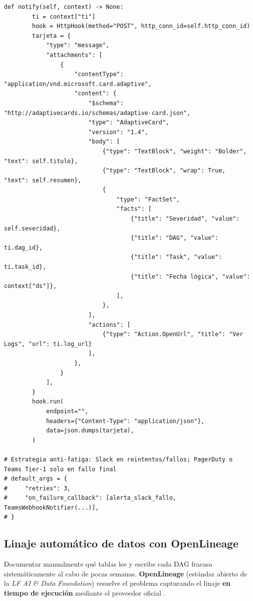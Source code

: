 \begin{lstlisting}[style=python, caption={Configuración de \texttt{SlackWebhookNotifier} y desarrollo de un \texttt{BaseNotifier} propio para Microsoft Teams.}, label={lst:notifiers-produccion}]
    def notify(self, context) -> None:
        ti = context["ti"]
        hook = HttpHook(method="POST", http_conn_id=self.http_conn_id)
        tarjeta = {
            "type": "message",
            "attachments": [
                {
                    "contentType": "application/vnd.microsoft.card.adaptive",
                    "content": {
                        "$schema": "http://adaptivecards.io/schemas/adaptive-card.json",
                        "type": "AdaptiveCard",
                        "version": "1.4",
                        "body": [
                            {"type": "TextBlock", "weight": "Bolder", "text": self.titulo},
                            {"type": "TextBlock", "wrap": True, "text": self.resumen},
                            {
                                "type": "FactSet",
                                "facts": [
                                    {"title": "Severidad", "value": self.severidad},
                                    {"title": "DAG", "value": ti.dag_id},
                                    {"title": "Task", "value": ti.task_id},
                                    {"title": "Fecha lógica", "value": context["ds"]},
                                ],
                            },
                        ],
                        "actions": [
                            {"type": "Action.OpenUrl", "title": "Ver Logs", "url": ti.log_url}
                        ],
                    },
                }
            ],
        }
        hook.run(
            endpoint="",
            headers={"Content-Type": "application/json"},
            data=json.dumps(tarjeta),
        )

# Estrategia anti-fatiga: Slack en reintentos/fallos; PagerDuty o Teams Tier-1 solo en fallo final
# default_args = {
#     "retries": 3,
#     "on_failure_callback": [alerta_slack_fallo, TeamsWebhookNotifier(...)],
# }
\end{lstlisting}

\subsection{Linaje automático de datos con OpenLineage}

Documentar manualmente qué tablas lee y escribe cada DAG fracasa sistemáticamente al cabo de pocas semanas. \textbf{OpenLineage} (estándar abierto de la \textit{LF AI \& Data Foundation}) resuelve el problema capturando el linaje \textbf{en tiempo de ejecución} mediante el proveedor oficial .

